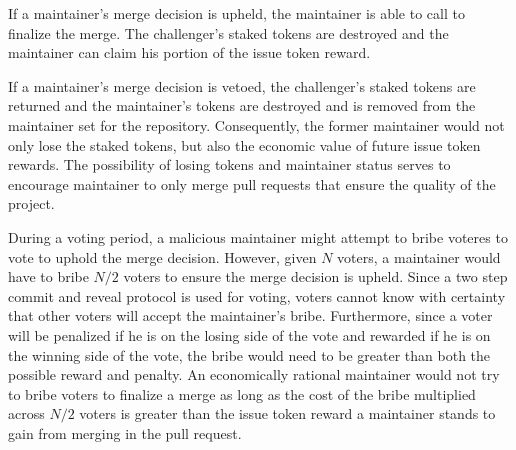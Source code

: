 If a maintainer's merge decision is upheld, the maintainer is able to call
 to finalize the merge. The challenger's
 staked tokens are destroyed and the maintainer can
claim his portion of the issue token reward.

If a maintainer's merge decision is vetoed, the challenger's staked tokens are
returned and the maintainer's  tokens are destroyed and is removed from the maintainer set for the
repository. Consequently, the former maintainer would not only lose the staked
tokens, but also the economic value of future issue token rewards. The
possibility of losing tokens and maintainer status serves to encourage
maintainer to only merge pull requests that ensure the quality of the project.

During a voting period, a malicious maintainer might attempt to bribe voteres
to vote to uphold the merge decision. However, given $N$ voters, a maintainer
would have to bribe $N/2$ voters to ensure the merge decision is upheld. Since a
two step commit and reveal protocol is used for voting, voters cannot know with
certainty that other voters will accept the maintainer's bribe. Furthermore,
since a voter will be penalized if he is on the losing side of the vote and
rewarded if he is on the winning side of the vote, the bribe would need to be
greater than both the possible reward and penalty. An economically rational
maintainer would not try to bribe voters to finalize a merge as long as the cost
of the bribe multiplied across $N/2$ voters is greater than the issue token reward a
maintainer stands to gain from merging in the pull request.

